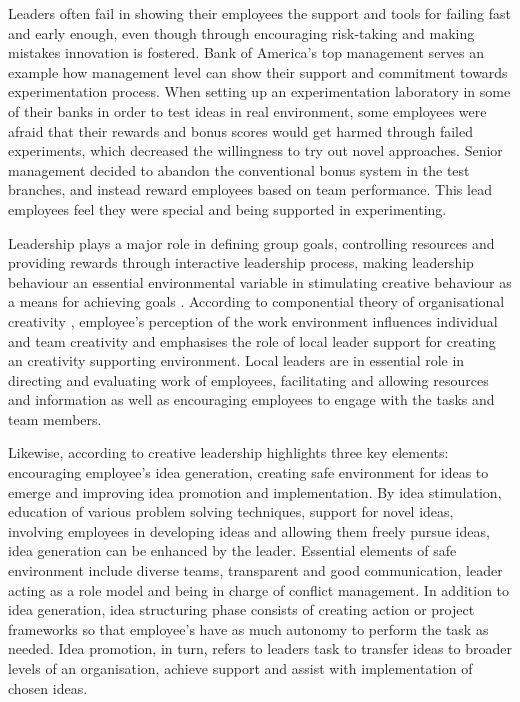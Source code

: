 Leaders often fail in showing their employees the support and tools for failing fast and early enough, even though through encouraging risk-taking and making mistakes innovation is fostered.\citep{farson2002failuretolerantleader} Bank of America's top management serves an example how management level can show their support and commitment towards experimentation process. When setting up an experimentation laboratory in some of their banks in order to test ideas in real environment, some employees were afraid that their rewards and bonus scores would get harmed through failed experiments, which decreased the willingness to try out novel approaches. Senior management decided to abandon the conventional bonus system in the test branches, and instead reward employees based on team performance. This lead employees feel they were special and being supported in experimenting. \citep{thomke2003r}

Leadership plays a major role in defining group goals, controlling resources and providing rewards through interactive leadership process, making leadership behaviour an essential environmental variable in stimulating creative behaviour as a means for achieving goals \citep{redmond1993putting}. According to componential theory of organisational creativity \citep{hennessey19881,amabile1996assessing}, employee's perception of the work environment influences individual and team creativity and emphasises the role of local leader support for creating an creativity supporting environment. Local leaders are in essential role in directing and evaluating work of employees, facilitating and allowing resources and information as well as encouraging employees to engage with the tasks and team members. \citep{amabile2004leader}
 
Likewise, according to \citet{mumford2002leading} creative leadership highlights three key elements: encouraging employee's idea generation, creating safe environment for ideas to emerge and improving idea promotion and implementation. By idea stimulation, education of various problem solving techniques, support for novel ideas, involving employees in developing ideas and allowing them freely pursue ideas, idea generation can be enhanced by the leader. Essential elements of safe environment include diverse teams, transparent and good communication, leader acting as a role model and being in charge of conflict management. In addition to idea generation, idea structuring phase consists of creating action or project frameworks so that employee's have as much autonomy to perform the task as needed. Idea promotion, in turn, refers to leaders task to transfer ideas to broader levels of an organisation, achieve support and assist with implementation of chosen ideas. \citep{mumford2002leading} 

